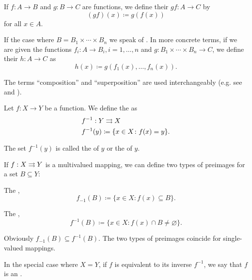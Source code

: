 \begin{definition}\label{def:function_composition}
  If \( f: A \to B \) and \( g: B \to C \) are functions, we define their  \( gf: A \to C \) by
  \begin{equation*}
    (gf)(x) \coloneqq g(f(x))
  \end{equation*}
  for all \( x \in A \).

  If the case where \( B = B_1 \times \cdots \times B_n \) we speak of . In more concrete terms, if we are given the functions \( f_i: A \to B_i, i = 1, \ldots, n \) and \( g: B_1 \times \cdots \times B_n \to C \), we define their  \( h: A \to C \) as
  \begin{equation*}
    h(x) \coloneqq g(f_1(x), \ldots, f_n(x)).
  \end{equation*}

  The terms \enquote{composition} and \enquote{superposition} are used interchangeably (e.g. see \cite[44]{Enderton1977} and \cite[]{Фихтенгольц1968/1}).
\end{definition}

\begin{definition}\label{def:function_preimage}
  Let \( f: X \to Y \) be a function. We define the  as
  \begin{align*}
    &f^{-1} : Y \rightrightarrows X \\
    &f^{-1}(y) \coloneqq \{ x \in X \colon f(x) = y \}.
  \end{align*}

  The set \( f^{-1}(y) \) is called the  of \( y \) or the  of \( y \).

  If \( f : X \rightrightarrows Y \) is a multivalued mapping, we can define two types of preimages for a set \( B \subseteq Y \):
  \begin{defenum}
    \item The ,
    \begin{equation*}
      f_{-1}(B) \coloneqq \{ x \in X \colon f(x) \subseteq B \}.
    \end{equation*}

    \item The ,
    \begin{equation*}
      f^{-1}(B) \coloneqq \{ x \in X \colon f(x) \cap B \neq \varnothing \}.
    \end{equation*}
  \end{defenum}

  Obviously \( f_{-1}(B) \subseteq f^{-1}(B) \). The two types of preimages coincide for single-valued mappings.

  In the special case where \( X = Y \), if \( f \) is equivalent to its inverse \( f^{-1} \), we say that \( f \) is an .
\end{definition}


